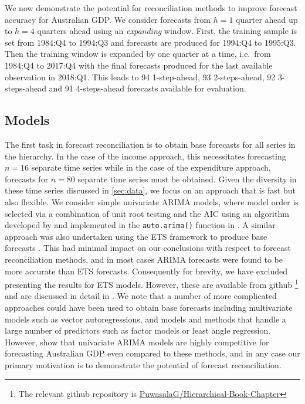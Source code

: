 \documentclass[graybox]{svmult}
\begin{document}
We now demonstrate the potential for reconciliation methods to improve forecast accuracy for Australian GDP\@. We consider forecasts from $h=1$ quarter ahead up to $h=4$ quarters ahead using an \emph{expanding} window. First, the training sample is set from 1984:Q4 to 1994:Q3 and forecasts are produced for 1994:Q4 to 1995:Q3. Then the training window is expanded by one quarter at a time, i.e.\ from 1984:Q4 to 2017:Q4 with the final forecasts produced for the last available observation in 2018:Q1. This leads to 94 1-step-ahead, 93 2-steps-ahead, 92 3-steps-ahead and 91 4-steps-ahead forecasts available for evaluation.

\subsection{Models}

The first task in forecast reconciliation is to obtain base forecasts for all series in the hierarchy. In the case of the income approach, this necessitates forecasting $n=16$ separate time series while in the case of the expenditure approach, forecasts for $n=80$ separate time series must be obtained. Given the diversity in these time series discussed in \autoref{sec:data}, we focus on an approach that is fast but also flexible. We consider simple univariate ARIMA models, where model order is selected via a combination of unit root testing and the AIC using an algorithm developed by \citet{HK08} and implemented in the \verb|auto.arima()| function in \citet{Rforecast}. A similar approach was also undertaken using the ETS framework to produce base forecasts \citep{expsmooth08}. This had minimal impact on our conclusions with respect to forecast reconciliation methods, and in most cases ARIMA forecasts were found to be more accurate than ETS forecasts. Consequently for brevity, we have excluded presenting the results for ETS models. However, these are available from github \footnote {The relevant github repository is \href{https://github.com/PuwasalaG/Hierarchical-Book-Chapter}{PuwasalaG/Hierarchical-Book-Chapter}} and are discussed in detail in \cite{gamakumara2019phd}. We note that a number of more complicated approaches could have been used to obtain base forecasts including multivariate models such as vector autoregressions, and models and methods that handle a large number of predictors such as factor models or least angle regression. However, \citet{PanEtAl2019} show that univariate ARIMA models are highly competitive for forecasting Australian GDP even compared to these methods, and in any case our primary motivation is to demonstrate the potential of forecast reconciliation.
\end{document}
